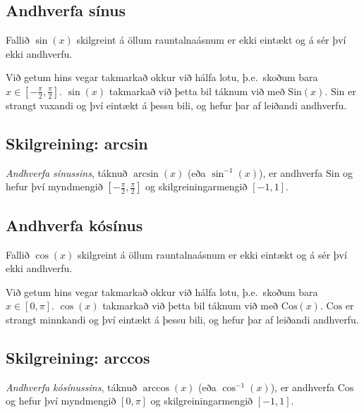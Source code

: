 \documentclass[a4paper,10pt,icelandic]{sphinxmanual}
\begin{document}
\subsection{Andhverfa sínus}
\label{kafli04:andhverfa-sinus}
Fallið \(\sin(x)\) skilgreint á öllum rauntalnaásnum er ekki eintækt
og á sér því ekki andhverfu.

Við getum hins vegar takmarkað okkur við hálfa lotu, þ.e. skoðum bara
\(x\in [-\frac \pi 2, \frac \pi 2]\). \(\sin(x)\) takmarkað við
þetta bil táknum við með \({{\text{Sin}}}(x)\).
\({{\text{Sin}}}\) er strangt vaxandi og því eintækt á þessu bili,
og hefur þar af leiðandi andhverfu.


\subsection{Skilgreining: arcsin}
\label{kafli04:skilgreining-arcsin}
\emph{Andhverfa sínussins}, táknuð \(\arcsin(x)\) (eða
\(\sin^{-1}(x)\)), er andhverfa \({{\text{Sin}}}\) og hefur því
myndmengið \([-\frac \pi 2,
\frac \pi 2]\) og skilgreiningarmengið \([-1,1]\).



\subsection{Andhverfa kósínus}
\label{kafli04:andhverfa-kosinus}
Fallið \(\cos(x)\) skilgreint á öllum rauntalnaásnum er ekki eintækt
og á sér því ekki andhverfu.

Við getum hins vegar takmarkað okkur við hálfa lotu, þ.e. skoðum bara
\(x\in [0, \pi]\). \(\cos(x)\) takmarkað við þetta bil táknum
við með \({{\text{Cos}}}(x)\). \({{\text{Cos}}}\) er strangt
minnkandi og því eintækt á þessu bili, og hefur þar af leiðandi
andhverfu.


\subsection{Skilgreining: arccos}
\label{kafli04:skilgreining-arccos}
\emph{Andhverfa kósínussins}, táknuð \(\arccos(x)\) (eða
\(\cos^{-1}(x)\)), er andhverfa \({{\text{Cos}}}\) og hefur því
myndmengið \([0,\pi]\) og skilgreiningarmengið \([-1,1]\).

\end{document}
